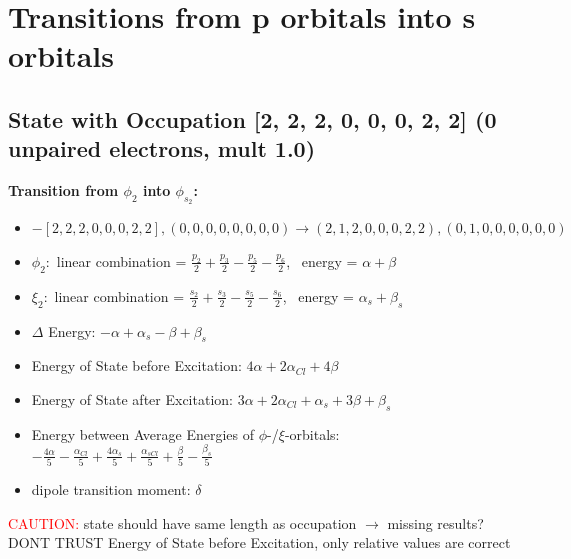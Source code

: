 \documentclass[12pt,a4paper]{article}
\begin{document}
\newpage \section*{Transitions from p orbitals into s orbitals}\subsection*{State with Occupation [2, 2, 2, 0, 0, 0, 2, 2] (0 unpaired electrons, mult 1.0)}
        \noindent\textbf{Transition from $\phi_{2}$ into $\phi_{s_{2}}$:}
        \begin{itemize}
            \item $- [2, 2, 2, 0, 0, 0, 2, 2], (0, 0, 0, 0, 0, 0, 0, 0) \rightarrow (2, 1, 2, 0, 0, 0, 2, 2), (0, 1, 0, 0, 0, 0, 0, 0)$
        
            \item $\phi_{2}:$ linear combination = $\frac{p_{2}}{2} + \frac{p_{3}}{2} - \frac{p_{5}}{2} - \frac{p_{6}}{2}$, \
            energy = $\alpha + \beta$
            
            \item $\xi_{2}:$ linear combination = $\frac{s_{2}}{2} + \frac{s_{3}}{2} - \frac{s_{5}}{2} - \frac{s_{6}}{2}$, \
            energy = $\alpha_{s} + \beta_{s}$
            
            \item $\Delta$ Energy: $- \alpha + \alpha_{s} - \beta + \beta_{s}$
            \item Energy of State before Excitation: $4 \alpha + 2 \alpha_{Cl} + 4 \beta$
            \item Energy of State after Excitation: $3 \alpha + 2 \alpha_{Cl} + \alpha_{s} + 3 \beta + \beta_{s}$
            \item Energy between Average Energies of $\phi$-/$\xi$-orbitals: \
            $- \frac{4 \alpha}{5} - \frac{\alpha_{Cl}}{5} + \frac{4 \alpha_{s}}{5} + \frac{\alpha_{s Cl}}{5} + \frac{\beta}{5} - \frac{\beta_{s}}{5}$
        
            \item dipole transition moment: $\delta$
        
        \end{itemize}
        
	\textcolor{red}{CAUTION:} state should have same length as occupation $\rightarrow$ missing results?
	DONT TRUST \glqq{}Energy of State before Excitation\grqq{}, only relative values are correct
\end{document}

